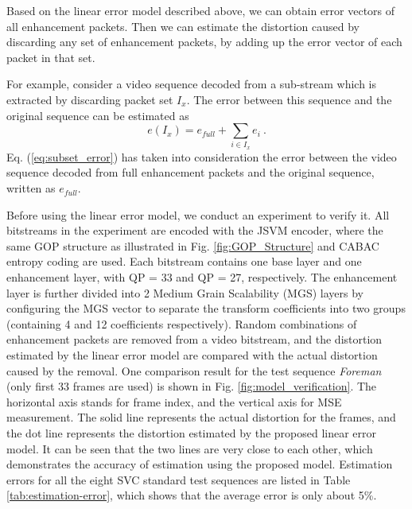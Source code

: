 \documentclass[journal]{IEEEtran}
\begin{document}
Based on the linear error model described above, we can obtain error vectors of all enhancement packets. Then we can estimate the distortion caused by discarding any set of enhancement packets, by adding up the error vector of each packet in that set.

For example, consider a video sequence decoded from a sub-stream which is extracted by discarding packet set $I_x$. The error between this sequence and the original sequence can be estimated as
\begin{equation}
\label{eq:subset_error}
e(I_x) = e_{full} + \sum_{i \in {I_x}} e_i \: .
\end{equation}
Eq. (\ref{eq:subset_error}) has taken into consideration the error between the video sequence decoded from full enhancement packets and the original sequence, written as $e_{full}$.

Before using the linear error model, we conduct an experiment to verify it. All bitstreams in the experiment are encoded with the JSVM encoder, where the same GOP structure as illustrated in Fig. \ref{fig:GOP_Structure} and CABAC entropy coding are used. Each bitstream contains one base layer and one enhancement layer, with QP = 33 and QP = 27, respectively. The enhancement layer is further divided into 2 Medium Grain Scalability (MGS) layers by configuring the MGS vector to separate the transform coefficients into two groups (containing 4 and 12 coefficients respectively). Random combinations of enhancement packets are removed from a video bitstream, and the distortion estimated by the linear error model are compared with the actual distortion caused by the removal. One comparison result for the test sequence {\em Foreman} (only first 33 frames are used) is shown in Fig. \ref{fig:model_verification}. The horizontal axis stands for frame index, and the vertical axis for MSE measurement. The solid line represents the actual distortion for the frames, and the dot line represents the distortion estimated by the proposed linear error model. It can be seen that the two lines are very close to each other, which demonstrates the accuracy of estimation using the proposed model. Estimation errors for all the eight SVC standard test sequences are listed in Table \ref{tab:estimation-error}, which shows that the average error is only about 5\%.
\end{document}
